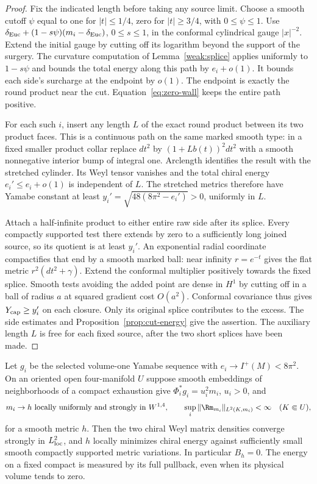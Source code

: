 \begin{proof}
Fix the indicated length before taking any source limit. Choose a
smooth cutoff \(\psi\) equal to one for \(|t|\le 1/4\), zero for
\(|t|\ge3/4\), with \(0\le\psi\le1\). Use
\(\delta_{\rm Euc}+(1-s\psi)(m_i-\delta_{\rm Euc})\),
\(0\le s\le1\), in the conformal cylindrical gauge \(|x|^{-2}\).
Extend the initial gauge by cutting off its logarithm beyond the
support of the surgery. The curvature computation of
Lemma~\ref{weak:splice} applies uniformly to \(1-s\psi\)
and bounds the total energy along this path by \(e_i+o(1)\).
It bounds each side's surcharge at the endpoint by \(o(1)\).
The endpoint is exactly the round product near the cut.
Equation~\eqref{eq:zero-wall} keeps the entire path positive.

For each such \(i\), insert any length \(L\) of the exact round
product between its two product faces. This is a continuous path
on the same marked smooth type: in a fixed smaller product collar
replace \(dt^2\) by \((1+L b(t))^2dt^2\) with a smooth
nonnegative interior bump of integral one. Arclength identifies
the result with the stretched cylinder. Its Weyl tensor vanishes
and the total chiral energy \(e_i'\le e_i+o(1)\) is independent
of \(L\). The stretched metrics therefore have Yamabe constant at
least \(y_i'=\sqrt{48(8\pi^2-e_i')}>0\), uniformly in \(L\).

Attach a half-infinite product to either entire raw side after its
splice. Every compactly supported test there extends by zero to a
sufficiently long joined source, so its quotient is at least \(y_i'\).
An exponential radial coordinate compactifies that end by a smooth
marked ball: near infinity \(r=e^{-t}\) gives the flat metric
\(r^2(dt^2+\gamma)\). Extend the conformal multiplier positively
towards the fixed splice. Smooth tests avoiding the added point
are dense in \(H^1\) by cutting off in a ball of radius \(a\)
at squared gradient cost \(O(a^2)\). Conformal covariance thus gives
\(Y_{\rm cap}\ge y_i'\) on each closure. Only its original splice
contributes to the excess. The side estimates and
Proposition~\ref{prop:cut-energy} give the assertion. The auxiliary
length \(L\) is free for each fixed source, after the two short
splices have been made.
\end{proof}

\begin{theorem}\label{thm:local-min}
Let \(g_i\) be the selected volume-one Yamabe sequence with
\(e_i\to I^+(M)<8\pi^2\). On an oriented open four-manifold \(U\)
suppose smooth embeddings of neighborhoods of a compact exhaustion
give \(\Phi_i^*g_i=u_i^2m_i\), \(u_i>0\), and
\[
 m_i\to h\text{ locally uniformly and strongly in }W^{1,4},
 \qquad \sup_i\|\Rm_{m_i}\|_{L^2(K,m_i)}<\infty
 \quad (K\Subset U),
\]
for a smooth metric \(h\). Then the two chiral Weyl matrix
densities converge strongly in \(L^2_{\rm loc}\), and \(h\)
locally minimizes chiral energy against sufficiently small smooth
compactly supported metric variations. In particular \(B_h=0\).
The energy on a fixed compact is measured by its full pullback,
even when its physical volume tends to zero.
\end{theorem}

